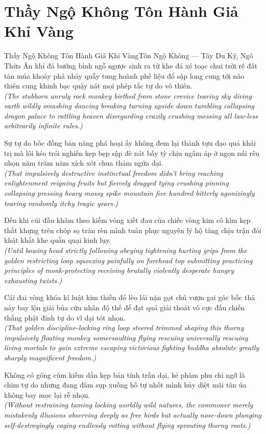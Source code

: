 \section{Thầy Ngộ Không Tôn Hành Giả Khỉ Vàng}
\begin{truyen}{Thầy Ngộ Không Tôn Hành Giả Khỉ Vàng}{Tôn Ngộ Không --- Tây Du Ký, Ngô Thừa Ân}
 khỉ đá bướng bỉnh ngỗ ngược sinh ra từ khe đá xé toạc chui trời rẽ đất tản múa khoáy phá nhảy quẫy tung hoành phế liệu đổ sập long cung tới náo thiên cung khinh bạc quậy nát mọi phép tắc tự do vô thiên.\\[4pt]
\textit{(The stubborn unruly rock monkey birthed from stone crevice tearing sky diving earth wildly smashing dancing breaking turning upside down tumbling collapsing dragon palace to rattling heaven disregarding crazily crushing messing all law-less arbitrarily infinite rules.)}

Sự tự do bốc đồng bản năng phá hoại ấy không đem lại thành tựu đạo quả khải trị mà lôi kéo trói nghiến kẹp bẹp sập đè nát bấy tỳ chịu ngâm áp ở ngọn núi rêu nhọn năm trăm năm xích xót chua thảm ngứa dại.\\[4pt]
\textit{(That impulsively destructive instinctual freedom didn't bring reaching enlightenment reigning fruits but fiercely dragged tying crushing pinning collapsing pressing heavy mossy spike mountain five hundred bitterly agonizingly tearing randomly itchy tragic years.)}

Đến khi cúi đầu khâm theo kiềm vòng xiết đau của chiếc vòng kim cô kìm kẹp thắt khựng trên chóp sọ trán rèn mình tuân phục nguyên lý hộ tăng chịu trận đói khát khắt khe quằn quại kinh lụy.\\[4pt]
\textit{(Until bowing head strictly following obeying tightening hurting grips from the golden restricting loop squeezing painfully on forehead top submitting practicing principles of monk-protecting receiving brutally violently desperate hungry exhausting twists.)}

Cái đai vòng khóa kỉ luật kim thiền đó lèo lái nặn gọt chú vượn gai góc bốc thả này bay lộn giải bủa cứu nhân độ thế để đạt quả giải thoát vô cực đấu chiến thắng phật đỉnh tự do vĩ dại tót nhọn.\\[4pt]
\textit{(That golden discipline-locking ring loop steered trimmed shaping this thorny impulsively floating monkey somersaulting flying rescuing universally rescuing living mortals to gain extreme escaping victorious fighting buddha absolute greatly sharply magnificent freedom.)}

\end{truyen}
\begin{baihoc}
  Không có gông cùm kiềm dằn kẹp bản tính trần dại, kẻ phàm phu chỉ ngỡ là chim tự do nhưng đang đâm sụp xuống hố tự nhốt mình hủy diệt mãi tàn úa không bay mọc lại rễ nhọn.\\[4pt]
  \textit{(Without restraining taming locking worldly wild natures, the commoner merely mistakenly illusions observing deeply as free birds but actually nose-down plunging self-destroyingly caging endlessly rotting without flying sprouting thorny roots.)}
\end{baihoc}

